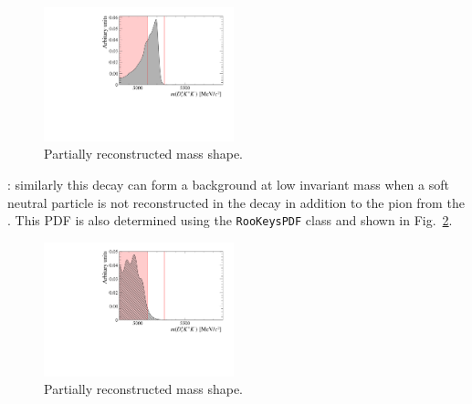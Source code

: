 \begin{figure}[!h]
    \centering
    \includegraphics[width=0.49\textwidth]{figs/B2DsKK/Bs2Dsa1_4800_5900_Shape.pdf}
    \caption{Partially reconstructed \decay{\Bsb}{\Dsp\Km\Kstarz} mass shape.}
    \label{fig:B2DsKK_part_reco_backgrounds_DsKKstar}   
\end{figure}

\begin{description}
\item \decay{\Bsb}{\Dssp\Km\Kstarz}: similarly this decay can form a background at low invariant mass when a soft neutral particle is not reconstructed in the  decay in addition to the pion from the \Kstarz. This PDF is also determined using the \texttt{RooKeysPDF} class and shown in Fig.~\ref{fig:B2DsKK_part_reco_backgrounds_DssKKstar}.
\end{description}

\begin{figure}[!h]
    \centering
    \includegraphics[width=0.49\textwidth]{figs/B2DsKK/Bs2DsstKKst_4800_5900_Shape.pdf}
    \caption{Partially reconstructed \decay{\Bsb}{\Dssp\Km\Kstarz} mass shape.}
    \label{fig:B2DsKK_part_reco_backgrounds_DssKKstar}   
\end{figure}

